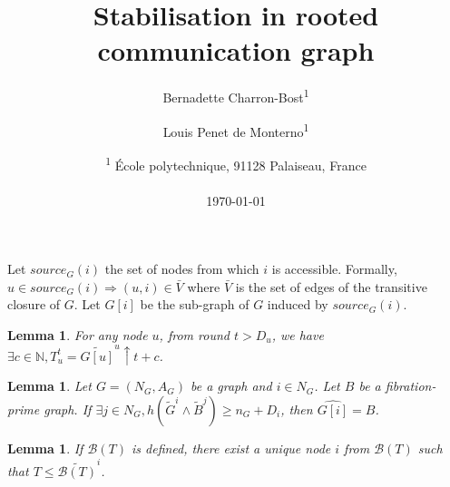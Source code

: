 \documentclass[11pt,letterpaper]{article}
\title{Stabilisation in rooted communication graph}
\author{Bernadette Charron-Bost\textsuperscript{1} \and Louis Penet de Monterno\textsuperscript{1}}
\date{\textsuperscript{1} \'Ecole polytechnique, 91128 Palaiseau, France\\~\\ \today}
\newtheorem{lem}[thm]{Lemma}
\begin{document}
\maketitle

Let $source_G(i)$ the set of nodes from which $i$ is accessible.
Formally, $u \in source_G(i) \Rightarrow (u,i) \in \bar V$ where $\bar V$ is the set of edges of the transitive closure of $G$.
Let $G[i]$ be the sub-graph of $G$ induced by $source_G(i)$.

\begin{lem} \label{lem:viewconst}
	For any node $u$, from round $t > D_u$, we have
	$\exists c \in \mathds{N}, T_u^t = \widetilde{G[u]}^u \uparrow t+c$.
\end{lem}

\begin{lem} \label{lem:safB} 
	Let $G = (N_G, A_G)$ be a graph and $i \in N_G$.
	Let $B$ be a fibration-prime graph.
	If $\exists j \in N_G, h(\tilde{G}^i \wedge \tilde{B}^j) \geq n_G + D_i$, then $\widehat{G[i]} = B$.
\end{lem}

\begin{lem} \label{lem:getid}
	If $\mathcal{B}(T)$ is defined, there exist a unique node $i$ from $\mathcal{B}(T)$ such that $T \leq \widetilde{\mathcal{B}(T)}^i$.
\end{lem}
\end{document}
